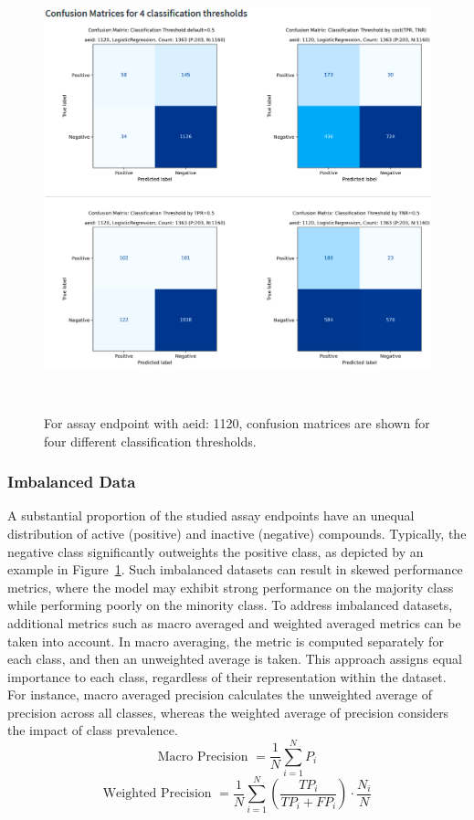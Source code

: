 \begin{figure}[h]
  \centering
  \includegraphics[width=1.0\textwidth]{figures/cm1120.png}
  \caption{For assay endpoint with aeid: 1120, confusion matrices are shown for four different classification thresholds.}
~\label{fig:cm1120}
\end{figure}

\subsubsection{Imbalanced Data}
A substantial proportion of the studied assay endpoints have an unequal distribution of active (positive) and inactive (negative) compounds. Typically, the negative class significantly outweights the positive class, as depicted by an example in Figure~\ref{fig:cm1120}. Such imbalanced datasets can result in skewed performance metrics, where the model may exhibit strong performance on the majority class while performing poorly on the minority class. To address imbalanced datasets, additional metrics such as macro averaged and weighted averaged metrics can be taken into account.
In macro averaging, the metric is computed separately for each class, and then an unweighted average is taken. This approach assigns equal importance to each class, regardless of their representation within the dataset. For instance, macro averaged precision calculates the unweighted average of precision across all classes, whereas the weighted average of precision considers the impact of class prevalence.
\[ \text{Macro Precision } = \frac{1}{N} \sum_{i=1}^{N} P_i \] 
\[ \text{Weighted Precision } = \frac{1}{N} \sum_{i=1}^{N} \left(\frac{TP_i}{TP_i + FP_i}\right) \cdot \frac{N_i}{N} \]

